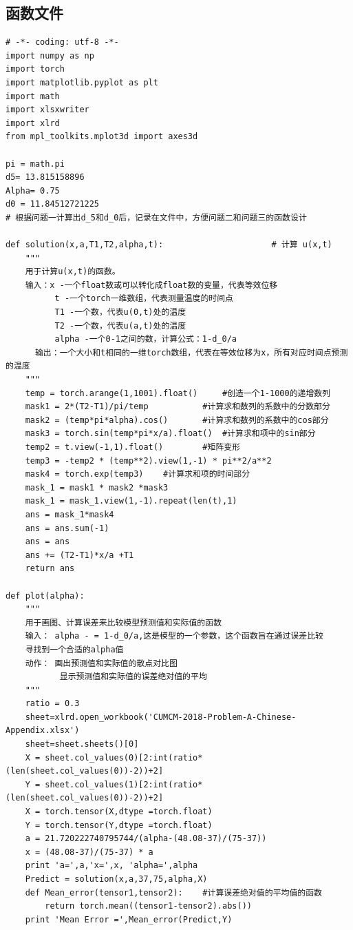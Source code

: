 \documentclass[bwprint]{cumcmthesis}
\begin{document}
\subsection{函数文件}
\begin{verbatim}
# -*- coding: utf-8 -*-
import numpy as np 
import torch 
import matplotlib.pyplot as plt
import math
import xlsxwriter
import xlrd
from mpl_toolkits.mplot3d import axes3d

pi = math.pi
d5= 13.815158896  
Alpha= 0.75 
d0 = 11.84512721225
# 根据问题一计算出d_5和d_0后，记录在文件中，方便问题二和问题三的函数设计

def solution(x,a,T1,T2,alpha,t):                      # 计算 u(x,t)
    """
    用于计算u(x,t)的函数。
    输入：x -一个float数或可以转化成float数的变量，代表等效位移
          t -一个torch一维数组，代表测量温度的时间点
          T1 -一个数，代表u(0,t)处的温度
          T2 -一个数，代表u(a,t)处的温度
          alpha -一个0-1之间的数，计算公式：1-d_0/a
      输出：一个大小和t相同的一维torch数组，代表在等效位移为x，所有对应时间点预测的温度
    """
    temp = torch.arange(1,1001).float()     #创造一个1-1000的递增数列      
    mask1 = 2*(T2-T1)/pi/temp           #计算求和数列的系数中的分数部分
    mask2 = (temp*pi*alpha).cos()       #计算求和数列的系数中的cos部分
    mask3 = torch.sin(temp*pi*x/a).float()  #计算求和项中的sin部分
    temp2 = t.view(-1,1).float()        #矩阵变形
    temp3 = -temp2 * (temp**2).view(1,-1) * pi**2/a**2 
    mask4 = torch.exp(temp3)    #计算求和项的时间部分
    mask_1 = mask1 * mask2 *mask3
    mask_1 = mask_1.view(1,-1).repeat(len(t),1)
    ans = mask_1*mask4
    ans = ans.sum(-1)
    ans = ans
    ans += (T2-T1)*x/a +T1
    return ans

def plot(alpha):
    """
    用于画图、计算误差来比较模型预测值和实际值的函数
    输入： alpha - = 1-d_0/a,这是模型的一个参数，这个函数旨在通过误差比较
    寻找到一个合适的alpha值
    动作： 画出预测值和实际值的散点对比图
           显示预测值和实际值的误差绝对值的平均
    """
    ratio = 0.3
    sheet=xlrd.open_workbook('CUMCM-2018-Problem-A-Chinese-Appendix.xlsx')
    sheet=sheet.sheets()[0]
    X = sheet.col_values(0)[2:int(ratio*(len(sheet.col_values(0))-2))+2]
    Y = sheet.col_values(1)[2:int(ratio*(len(sheet.col_values(0))-2))+2]
    X = torch.tensor(X,dtype =torch.float)
    Y = torch.tensor(Y,dtype =torch.float)
    a = 21.720222740795744/(alpha-(48.08-37)/(75-37))
    x = (48.08-37)/(75-37) * a
    print 'a=',a,'x=',x, 'alpha=',alpha
    Predict = solution(x,a,37,75,alpha,X)
    def Mean_error(tensor1,tensor2):    #计算误差绝对值的平均值的函数
        return torch.mean((tensor1-tensor2).abs())
    print 'Mean Error =',Mean_error(Predict,Y)


\end{verbatim}
\end{document}
